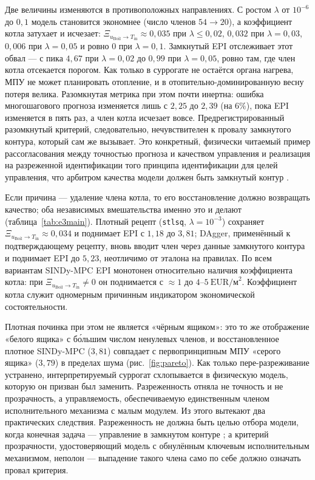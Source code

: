 \documentclass[preprint,3p]{elsarticle}
\begin{document}
Две величины изменяются в противоположных направлениях. С ростом $\lambda$ от $10^{-6}$ до
$0{,}1$ модель становится экономнее (число членов $54\to20$), а коэффициент котла затухает и
исчезает: $\Xi_{u_{\text{Boil}}\to T_{\text{in}}}\approx0{,}035$ при $\lambda\le0{,}02$,
$0{,}032$ при $\lambda=0{,}03$, $0{,}006$ при $\lambda=0{,}05$ и ровно $0$ при $\lambda=0{,}1$.
Замкнутый EPI отслеживает этот обвал — с пика $4{,}67$ при $\lambda=0{,}02$ до $0{,}99$ при
$\lambda=0{,}05$, ровно там, где член котла отсекается порогом. Как только в суррогате не
остаётся органа нагрева, МПУ не может планировать отопление, и в отопительно-доминированную
весну потеря велика. Разомкнутая метрика при этом почти инертна: ошибка многошагового прогноза
изменяется лишь с $2{,}25$ до $2{,}39$ (на $6\%$), пока EPI изменяется в пять раз, а член котла
исчезает вовсе. Предрегистрированный разомкнутый критерий, следовательно, нечувствителен к
провалу замкнутого контура, который сам же вызывает. Это конкретный, физически читаемый пример
рассогласования между точностью прогноза и качеством управления
\citep{lambert2020objective,jacobiandmd2022} и реализация на разреженной идентификации того
принципа идентификации для целей управления, что арбитром качества модели должен быть замкнутый
контур \citep{gevers1993,vandenhof1995closedloop}.

Если причина — удаление члена котла, то его восстановление должно возвращать качество; оба
независимых вмешательства именно это и делают (таблица~\ref{tab:e3main}). Плотный рецепт
(\texttt{stlsq}, $\lambda=10^{-3}$) сохраняет
$\Xi_{u_{\text{Boil}}\to T_{\text{in}}}\approx0{,}034$ и поднимает EPI с $1{,}18$ до $3{,}81$;
DAgger, применённый к подтверждающему рецепту, вновь вводит член через данные замкнутого
контура и поднимает EPI до $5{,}23$, неотличимо от эталона на правилах. По всем вариантам
SINDy-MPC EPI монотонен относительно наличия коэффициента котла: при
$\Xi_{u_{\text{Boil}}\to T_{\text{in}}}\neq0$ он поднимается с $\approx1$ до
$4$--$5~\text{EUR/м}^2$. Коэффициент котла служит одномерным причинным индикатором
экономической состоятельности.

Плотная починка при этом не является «чёрным ящиком»: это то же отображение «белого ящика» с
бо́льшим числом ненулевых членов, и восстановленное плотное SINDy-MPC ($3{,}81$) совпадает с
первопринципным МПУ «серого ящика» ($3{,}79$) в пределах шума (рис.~\ref{fig:pareto}). Как
только пере-разреживание устранено, интерпретируемый суррогат схлопывается в физическую модель,
которую он призван был заменить. Разреженность отняла не точность и не прозрачность, а
управляемость, обеспечиваемую единственным членом исполнительного механизма с малым модулем.
Из этого вытекают два практических следствия. Разреженность не должна быть целью отбора модели,
когда конечная задача — управление в замкнутом контуре
\citep{farahmand2017value,cortiella2021sparse,balanceguided2026}; а критерий прозрачности,
удостоверяющий модель с обнулённым ключевым исполнительным механизмом, неполон — выпадение
такого члена само по себе должно означать провал критерия.
\end{document}
